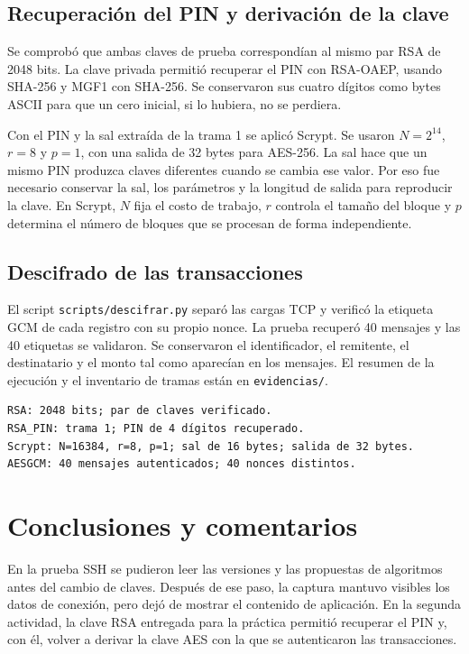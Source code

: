 \documentclass[letterpaper,11pt]{article}
\begin{document}
\subsection{Recuperación del PIN y derivación de la clave}
Se comprobó que ambas claves de prueba correspondían al mismo par RSA de 2048 bits. La clave privada permitió recuperar el PIN con RSA-OAEP, usando SHA-256 y MGF1 con SHA-256. Se conservaron sus cuatro dígitos como bytes ASCII para que un cero inicial, si lo hubiera, no se perdiera.

Con el PIN y la sal extraída de la trama 1 se aplicó Scrypt. Se usaron \(N=2^{14}\), \(r=8\) y \(p=1\), con una salida de 32 bytes para AES-256. La sal hace que un mismo PIN produzca claves diferentes cuando se cambia ese valor. Por eso fue necesario conservar la sal, los parámetros y la longitud de salida para reproducir la clave. En Scrypt, \(N\) fija el costo de trabajo, \(r\) controla el tamaño del bloque y \(p\) determina el número de bloques que se procesan de forma independiente.

\subsection{Descifrado de las transacciones}
El script \texttt{scripts/descifrar.py} separó las cargas TCP y verificó la etiqueta GCM de cada registro con su propio nonce. La prueba recuperó 40 mensajes y las 40 etiquetas se validaron. Se conservaron el identificador, el remitente, el destinatario y el monto tal como aparecían en los mensajes. El resumen de la ejecución y el inventario de tramas están en \texttt{evidencias/}.
\begin{Verbatim}[fontsize=\small]
RSA: 2048 bits; par de claves verificado.
RSA_PIN: trama 1; PIN de 4 dígitos recuperado.
Scrypt: N=16384, r=8, p=1; sal de 16 bytes; salida de 32 bytes.
AESGCM: 40 mensajes autenticados; 40 nonces distintos.
\end{Verbatim}


\section*{Conclusiones y comentarios}
En la prueba SSH se pudieron leer las versiones y las propuestas de algoritmos antes del cambio de claves. Después de ese paso, la captura mantuvo visibles los datos de conexión, pero dejó de mostrar el contenido de aplicación. En la segunda actividad, la clave RSA entregada para la práctica permitió recuperar el PIN y, con él, volver a derivar la clave AES con la que se autenticaron las transacciones.
\end{document}
